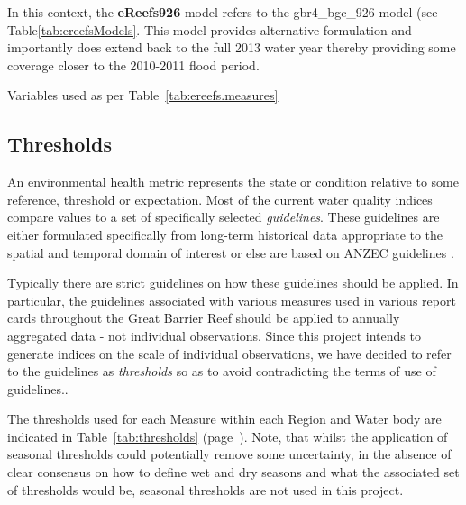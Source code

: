 In this context, the \textbf{eReefs926} model refers to the
gbr4\_bgc\_926 model (see Table\ref{tab:ereefsModels}. This model provides alternative formulation
and importantly does extend back to the full 2013 water year thereby providing some coverage closer
to the 2010-2011 flood period.

Variables used as per Table~\ref{tab:ereefs.measures}

\subsection{Thresholds}

An environmental health metric represents the state or condition relative to some reference,
threshold or expectation.  Most of the current water quality indices compare values to a set of
specifically selected \textit{guidelines}.  These guidelines are either formulated specifically from
long-term historical data appropriate to the spatial and temporal domain of interest or else are
based on ANZEC guidelines \citep{ANZEC-2000}.
 
Typically there are strict guidelines on how these guidelines should be applied.  In particular, the
guidelines associated with various measures used in various report cards throughout the Great
Barrier Reef should be applied to annually aggregated data - not individual observations.  Since
this project intends to generate indices on the scale of individual observations, we have decided to
refer to the guidelines as \textit{thresholds} so as to avoid contradicting the terms of use of
guidelines..
 
The thresholds used for each Measure within each Region and Water body are indicated in
Table~\ref{tab:thresholds} (page~\pageref{tab:thresholds}).  Note, that whilst the application of
seasonal thresholds could potentially remove some uncertainty, in the absence of clear consensus on
how to define wet and dry seasons and what the associated set of thresholds would be, seasonal
thresholds are not used in this project.
